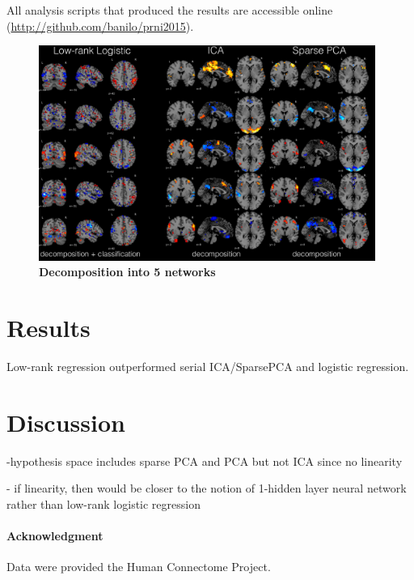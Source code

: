\documentclass[10pt, conference, compsocconf]{IEEEtran}
\begin{document}
All analysis scripts that produced the results are accessible online
(\url{http://github.com/banilo/prni2015}).


\begin{figure}
  \includegraphics[width=0.98\textwidth]{fig002}
  \caption {\textbf{Decomposition into 5 networks}}
\end{figure}

\section{Results}
Low-rank regression outperformed serial ICA/SparsePCA and logistic regression.



\section{Discussion}
%

-hypothesis space includes sparse PCA and PCA but not ICA since no
linearity


- if linearity, then would be closer to the notion of 1-hidden layer neural
network rather than low-rank logistic regression



%
\paragraph{Acknowledgment}
{\small
Data were provided the Human Connectome Project.
}

%
%


%
\end{document}

